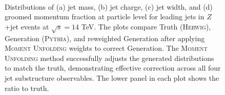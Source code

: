\begin{figure}
\\
\caption[Jet substructure distributions comparing truth, generation, and \textsc{Moment Unfolding} results]{Distributions of (a) jet mass, (b) jet charge, (c) jet width, and (d) groomed momentum fraction at particle level for leading jets in $Z$+jet events at $\sqrt{s} = 14$ TeV. The plots compare Truth (\textsc{Herwig}), Generation (\textsc{Pythia}), and reweighted Generation after applying \textsc{Moment Unfolding} weights to correct Generation.
%
The \textsc{Moment Unfolding} method successfully adjusts the generated distributions to match the truth, demonstrating effective correction across all four jet substructure observables. The lower panel in each plot shows the ratio to truth.}
\label{fig:jetexample_dists}
\end{figure}
